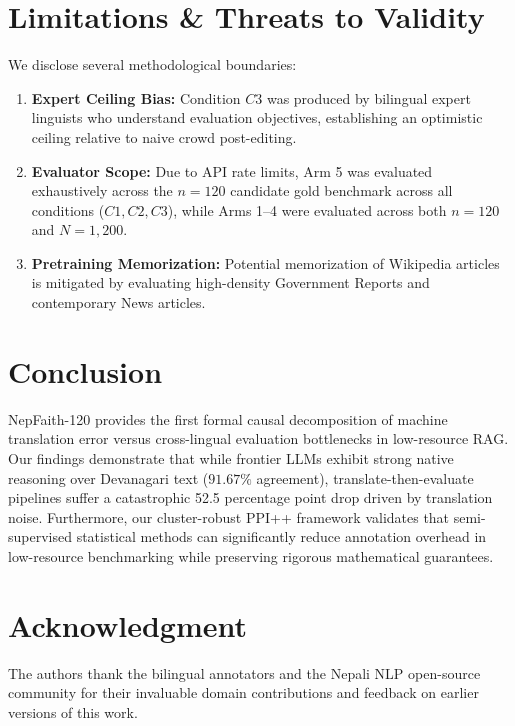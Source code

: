 \documentclass[conference]{IEEEtran}
\begin{document}
\section{Limitations \& Threats to Validity}
\label{sec:limitations}
We disclose several methodological boundaries:
\begin{enumerate}
    \item \textbf{Expert Ceiling Bias:} Condition $C3$ was produced by bilingual expert linguists who understand evaluation objectives, establishing an optimistic ceiling relative to naive crowd post-editing.
    \item \textbf{Evaluator Scope:} Due to API rate limits, Arm 5 was evaluated exhaustively across the $n=120$ candidate gold benchmark across all conditions ($C1, C2, C3$), while Arms 1--4 were evaluated across both $n=120$ and $N=1,200$.
    \item \textbf{Pretraining Memorization:} Potential memorization of Wikipedia articles is mitigated by evaluating high-density Government Reports and contemporary News articles.
\end{enumerate}

\section{Conclusion}
\label{sec:conclusion}
NepFaith-120 provides the first formal causal decomposition of machine translation error versus cross-lingual evaluation bottlenecks in low-resource RAG. Our findings demonstrate that while frontier LLMs exhibit strong native reasoning over Devanagari text ($91.67\%$ agreement), translate-then-evaluate pipelines suffer a catastrophic 52.5 percentage point drop driven by translation noise. Furthermore, our cluster-robust PPI++ framework validates that semi-supervised statistical methods can significantly reduce annotation overhead in low-resource benchmarking while preserving rigorous mathematical guarantees.

\section*{Acknowledgment}
The authors thank the bilingual annotators and the Nepali NLP open-source community for their invaluable domain contributions and feedback on earlier versions of this work.



\end{document}
